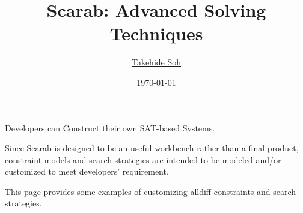 \documentclass[compress,dvipdfmx]{beamer}
\author{\href{http://kix.istc.kobe-u.ac.jp/~soh/}{Takehide Soh}}
\date{\today}
\title{Scarab: Advanced Solving Techniques}
\begin{document}
\maketitle


\begin{frame}[label=sec-1]{Developers can Construct their own SAT-based Systems.}
\begin{block}{Since Scarab is designed to be an useful workbench rather than a final product, constraint models and search strategies are intended to be modeled and/or customized to meet developers' requirement.}
\end{block}
\begin{block}{This page provides some examples of customizing \alert{alldiff constraints} and \alert{search strategies}.}
\end{block}
\end{frame}
\end{document}
